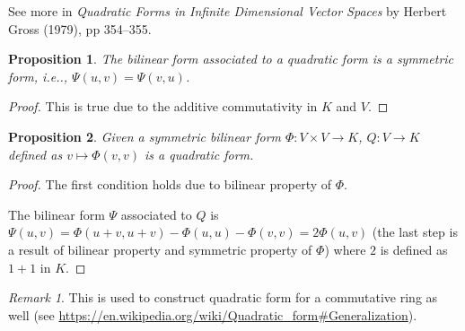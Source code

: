\documentclass[12pt, letterpaper]{article}
\makeatletter
\newcommand\ie{i.e\@ifnextchar.{}{.\@}}
\newcommand{\blue}[1]{{\color{blue} #1}}
\newtheorem{prop}{Proposition}[section]
\theoremstyle{definition}
\theoremstyle{remark}
\newtheorem*{rem*}{Remark}
\theoremstyle{definition}
\theoremstyle{plain}
\numberwithin{equation}{section}
\makeatother
\begin{document}
	\blue{See more in \textit{Quadratic Forms in Infinite Dimensional Vector Spaces} by
		Herbert Gross (1979), pp 354--355.}

	\begin{prop}
		The bilinear form associated to a quadratic form is a
		symmetric form, \ie, $\Psi(u,v)=\Psi(v,u)$.
	\end{prop}
	\begin{proof}
		This is true due to the additive commutativity in $K$ and $V$.
	\end{proof}
	
	\begin{prop}\label{propSymBilToQuad}
		Given a symmetric bilinear form $\Phi\colon V\times V\to K$,
		$Q\colon V\to K$ defined as $v\mapsto\Phi(v,v)$ is a quadratic form.
	\end{prop}
	\begin{proof}
		The first condition holds due to bilinear property of $\Phi$.
		
		The bilinear form $\Psi$ associated to $Q$ is $\Psi(u,v)=\Phi(u+v,u+v)-\Phi(u,u)-\Phi(v,v)=2\Phi(u,v)$
		(the last step is a result of bilinear property and symmetric property of $\Phi$)
		where $2$ is defined as $1+1$ in $K$.
	\end{proof}
	\begin{rem*}
		This is used to construct quadratic form for a commutative ring as well
		(see \url{https://en.wikipedia.org/wiki/Quadratic_form#Generalization}).
	\end{rem*}
	
\end{document}
